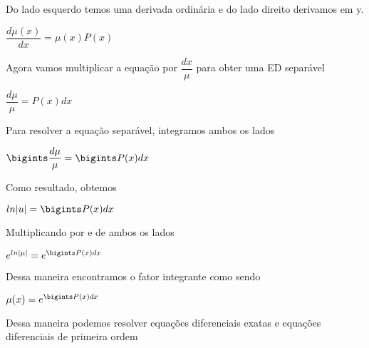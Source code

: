 Do lado esquerdo temos uma derivada ordinária e do lado direito derivamos em y. 

\begin{center}
$ \dfrac{d\mu(x)}{dx} = \mu(x)P(x) $
\end{center}

Agora vamos multiplicar a equação por $ \dfrac{dx}{\mu} $ para obter uma ED separável

\begin{center}
$ \dfrac{d\mu}{\mu} = P(x)dx $
\end{center}


Para resolver a equação separável, integramos ambos os lados

\begin{center}
$ \bigints \dfrac{d\mu}{\mu} = \bigints P(x)dx $
\end{center}

Como resultado, obtemos

\begin{center}
$ ln|u| =  \bigints P(x)dx $
\end{center}

Multiplicando por e de ambos os lados

\begin{center}
$ e^{ln|\mu|} = e^{\bigints P(x)dx} $
\end{center}

Dessa maneira encontramos o fator integrante como sendo

\begin{center}
$ \mu(x) = e^{\bigints P(x)dx} $
\end{center}

Dessa maneira podemos resolver equações diferenciais exatas e equações diferenciais de primeira ordem
